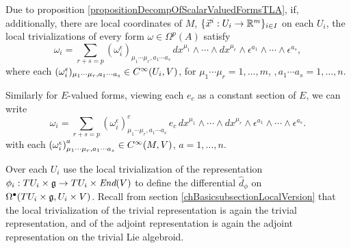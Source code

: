 \begin{remark} \label{remarkLocalDecompositionOfFormsOnTransitiveLieAlgebroidsIfTrivializationOfM} %
Due to proposition \ref{propositionDecompOfScalarValuedFormsTLA}, if, additionally, there are local coordinates of $M$, $\{\vec x^i: U_i \to \mathbb{R}^m\}_{i \in I}$ on each $U_i$, the local trivializations of every form $\omega \in \Omega^p(A)$ satisfy \begin{equation}
    \omega_i = \sum_{r + s = p} (\omega_i^\epsilon)_{\mu_1 \cdots \mu_r, a_1 \cdots a_s}\, dx^{\mu_1} \wedge \cdots \wedge dx^{\mu_r} \wedge \epsilon^{a_1} \wedge \cdots \wedge \epsilon^{a_s},
\end{equation}
where each $\lbtext{(\omega_i^\epsilon)_{\mu_1 \cdots \mu_r, a_1 \cdots a_s}} \in C^\infty(U_i, V)$, for $\mu_1 \cdots \mu_r = 1, \dots, m$, $, a_1 \cdots a_s = 1, \dots, n$. 

\noindent Similarly for $E$-valued forms, viewing each $e_c$ as a constant section of $E$, we can write
\begin{equation}
    \omega_i = \sum_{r + s = p} \left(\omega_i^\epsilon\right)^c_{\mu_1 \cdots \mu_r, a_1 \cdots a_s}\, e_c \, dx^{\mu_1} \wedge \cdots \wedge dx^{\mu_r} \wedge \epsilon^{a_1} \wedge \cdots \wedge \epsilon^{a_s}.
\end{equation} 
with each $\lbtext{\left(\omega_i^\epsilon\right)^a_{\mu_1 \cdots \mu_r, a_1 \cdots a_s}} \in C^\infty(M, V)$, $a = 1, \dots, n$.
\end{remark}

\begin{definition}
Over each $U_i$ use the local trivialization of the representation $\phi_i: TU_i\times \alg g \to TU_i \times \End(V)$ to define the differential $\hat d_\phi$ on $\Omega^\bullet(TU_i\times \mathfrak{g}, {U_i} \times V)$. Recall from section \ref{chBasicsubsectionLocalVersion} that the local trivialization of the trivial representation is again the trivial representation, and of the adjoint representation is again the adjoint representation on the trivial Lie algebroid.
\end{definition}



